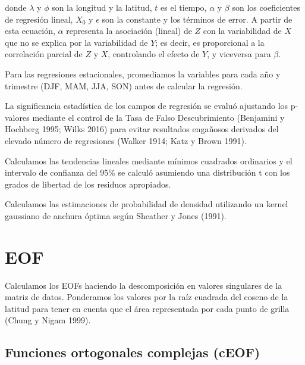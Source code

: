 \documentclass[12pt,oneside,a4paper]{reedthesis}
\begin{document}
donde \(\lambda\) y \(\phi\) son la longitud y la latitud, \(t\) es el tiempo, \(\alpha\) y \(\beta\) son los coeficientes de regresión lineal, \(X_0\) y \(\epsilon\) son la constante y los términos de error.
A partir de esta ecuación, \(\alpha\) representa la asociación (lineal) de \(Z\) con la variabilidad de \(X\) que no se explica por la variabilidad de \(Y\); es decir, es proporcional a la correlación parcial de \(Z\) y \(X\), controlando el efecto de \(Y\), y viceversa para \(\beta\).

Para las regresiones estacionales, promediamos la variables para cada año y trimestre (DJF, MAM, JJA, SON) antes de calcular la regresión.

La significancia estadística de los campos de regresión se evaluó ajustando los p-valores mediante el control de la Tasa de Falso Descubrimiento (Benjamini y Hochberg 1995; Wilks 2016) para evitar resultados engañosos derivados del elevado número de regresiones (Walker 1914; Katz y Brown 1991).

Calculamos las tendencias lineales mediante mínimos cuadrados ordinarios y el intervalo de confianza del 95\% se calculó asumiendo una distribución t con los grados de libertad de los residuos apropiados.

Calculamos las estimaciones de probabilidad de densidad utilizando un kernel gaussiano de anchura óptima según Sheather y Jones (1991).

\hypertarget{eof-1}{%
\section{EOF}\label{eof-1}}

Calculamos los EOFs haciendo la descomposición en valores singulares de la matriz de datos.
Ponderamos los valores por la raíz cuadrada del coseno de la latitud para tener en cuenta que el área representada por cada punto de grilla (Chung y Nigam 1999).

\hypertarget{ceof-metodo}{%
\subsection{Funciones ortogonales complejas (cEOF)}\label{ceof-metodo}}
\end{document}

